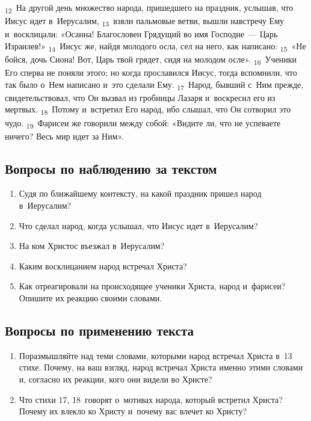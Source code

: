 \documentclass[a4paper,12pt]{article}
\begin{document}
\textsubscript{12}~На другой день множество народа, пришедшего на праздник, услышав, что Иисус идет в~Иерусалим, \textsubscript{13}~взяли пальмовые ветви, вышли навстречу Ему и~восклицали: «Осанна! Благословен Грядущий во имя Господне~--- Царь Израилев!» \textsubscript{14}~Иисус же, найдя молодого осла, сел на него, как написано: \textsubscript{15}~«Не бойся, дочь Сиона! Вот, Царь твой грядет, сидя на молодом осле». \textsubscript{16}~Ученики Его сперва не поняли этого; но когда прославился Иисус, тогда вспомнили, что так было о~Нем написано и~это сделали Ему. \textsubscript{17}~Народ, бывший с~Ним прежде, свидетельствовал, что Он вызвал из гробницы Лазаря и~воскресил его из мертвых. \textsubscript{18}~Потому и~встретил Его народ, ибо слышал, что Он сотворил это чудо. \textsubscript{19}~Фарисеи же говорили между собой: «Видите ли, что не успеваете ничего? Весь мир идет за Ним».

\subsection*{Вопросы по наблюдению за текстом}
\begin{enumerate}
    \item Судя по ближайшему контексту, на какой праздник пришел народ в~Иерусалим? 
    
    \myline
    
    \myline
    \item Что сделал народ, когда услышал, что Иисус идет в~Иерусалим? 
    
    \myline
    
    \myline
    \item На ком Христос въезжал в~Иерусалим? 
    
    \myline
    \item Каким восклицанием народ встречал Христа? 
    
    \myline
    
    \item Как отреагировали на происходящее ученики Христа, народ и~фарисеи? Опишите их реакцию своими словами. 
    
    \myline
    
    \myline
\end{enumerate}

\subsection*{Вопросы по применению текста} 
\begin{enumerate}
    \item Поразмышляйте над теми словами, которыми народ встречал Христа в~13 стихе. Почему, на ваш взгляд, народ встречал Христа именно этими словами и, согласно их реакции, кого они видели во Христе? 
    
    \myline
    
    \myline
    \item Что стихи 17, 18~говорят о~мотивах народа, который встретил Христа? Почему их влекло ко Христу и~почему вас влечет ко Христу? 
    
    \myline
    
    \myline
\end{enumerate}
\end{document}
